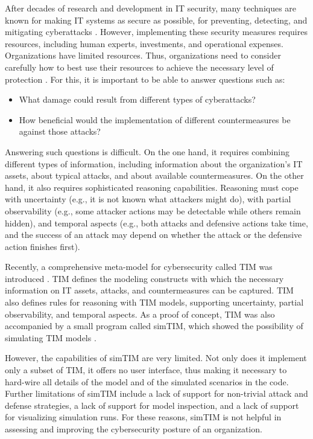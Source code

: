 \documentclass{llncs}
\begin{document}
After decades of research and development in IT security, many techniques are known for making IT systems as secure as possible, for preventing, detecting, and mitigating cyberattacks \cite{de2024whole}.
However, implementing these security measures requires resources, including human experts, investments, and operational expenses.
Organizations have limited resources.
Thus, organizations need to consider carefully how to best use their resources to achieve the necessary level of protection \cite{franco2024rcvar}.
For this, it is important to be able to answer questions such as:
\begin{itemize}
\item What damage could result from different types of cyberattacks?
\item How beneficial would the implementation of different countermeasures be against those attacks?
\end{itemize}
Answering such questions is difficult.
On the one hand, it requires combining different types of information, including information about the organization's IT assets, about typical attacks, and about available countermeasures.
On the other hand, it also requires sophisticated reasoning capabilities.
Reasoning must cope with uncertainty (e.g., it is not known what attackers might do), with partial observability (e.g., some attacker actions may be detectable while others remain hidden), and temporal aspects (e.g., both attacks and defensive actions take time, and the success of an attack may depend on whether the attack or the defensive action finishes first).

Recently, a comprehensive meta-model for cybersecurity called TIM was introduced \cite{mann2025time}.
TIM defines the modeling constructs with which the necessary information on IT assets, attacks, and countermeasures can be captured.
TIM also defines rules for reasoning with TIM models, supporting uncertainty, partial observability, and temporal aspects.
As a proof of concept, TIM was also accompanied by a small program called simTIM, which showed the possibility of simulating TIM models \cite{mann2025time}.

However, the capabilities of simTIM are very limited.
Not only does it implement only a subset of TIM, it offers no user interface, thus making it necessary to hard-wire all details of the model and of the simulated scenarios in the code.
Further limitations of simTIM include a lack of support for non-trivial attack and defense strategies, a lack of support for model inspection, and a lack of support for visualizing simulation runs.
For these reasons, simTIM is not helpful in assessing and improving the cybersecurity posture of an organization.
\end{document}

